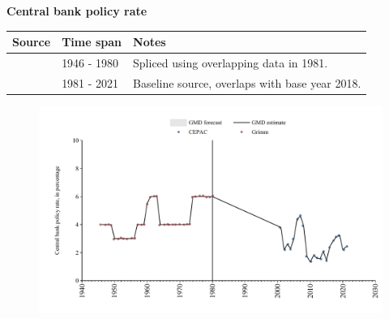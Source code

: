 \documentclass[12pt,a4paper,landscape]{article}
\begin{document}
\begin{adjustbox}{max totalsize={\paperwidth}{\paperheight},center}
\begin{minipage}[t][\textheight][t]{\textwidth}
\vspace*{0.5cm}
{}
\begin{center}
{\Large\bfseries Central bank policy rate}
\end{center}
\vspace{0.5cm}
\begin{table}[H]
\centering
\small
\begin{tabular}{|l|l|l|}
\hline
\textbf{Source} & \textbf{Time span} & \textbf{Notes} \\
\hline
\rowcolor{white}\cite{Grimm}& 1946 - 1980 &Spliced using overlapping data in 1981. \\
\rowcolor{lightgray}\cite{CEPAC}& 1981 - 2021 &Baseline source, overlaps with base year 2018. \\
\hline
\end{tabular}
\end{table}
\begin{figure}[H]
\centering
\includegraphics[width=\textwidth,height=0.6\textheight,keepaspectratio]{graphs/SLV_cbrate.pdf}
\end{figure}
\end{minipage}
\end{adjustbox}
\end{document}
